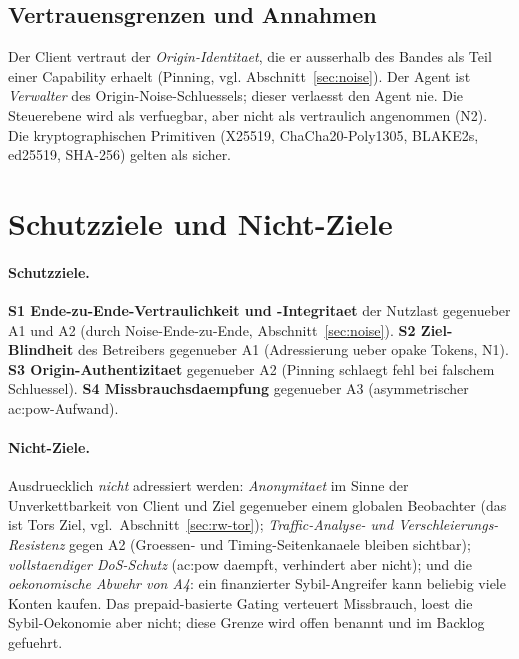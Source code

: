 \subsection{Vertrauensgrenzen und Annahmen}

Der Client vertraut der \emph{Origin-Identitaet}, die er ausserhalb des Bandes
als Teil einer Capability erhaelt (Pinning, vgl.
Abschnitt~\ref{sec:noise}). Der Agent ist \emph{Verwalter} des
Origin-Noise-Schluessels; dieser verlaesst den Agent nie. Die Steuerebene wird
als verfuegbar, aber nicht als vertraulich angenommen (N2). Die kryptographischen
Primitiven (X25519, ChaCha20-Poly1305, BLAKE2s, ed25519, SHA-256) gelten als
sicher.

\section{Schutzziele und Nicht-Ziele}
\label{sec:schutzziele}

\paragraph{Schutzziele.}
\textbf{S1 Ende-zu-Ende-Vertraulichkeit und -Integritaet} der Nutzlast gegenueber
A1 und A2 (durch Noise-Ende-zu-Ende, Abschnitt~\ref{sec:noise}).
\textbf{S2 Ziel-Blindheit} des Betreibers gegenueber A1 (Adressierung ueber opake
Tokens, N1). \textbf{S3 Origin-Authentizitaet} gegenueber A2 (Pinning schlaegt
fehl bei falschem Schluessel). \textbf{S4 Missbrauchsdaempfung} gegenueber A3
(asymmetrischer \gls{ac:pow}-Aufwand).

\paragraph{Nicht-Ziele.}
Ausdruecklich \emph{nicht} adressiert werden: \emph{Anonymitaet} im Sinne der
Unverkettbarkeit von Client und Ziel gegenueber einem globalen Beobachter (das
ist Tors Ziel, vgl.\ Abschnitt~\ref{sec:rw-tor}); \emph{Traffic-Analyse- und
Verschleierungs-Resistenz} gegen A2 (Groessen- und Timing-Seitenkanaele bleiben
sichtbar); \emph{vollstaendiger DoS-Schutz} (\gls{ac:pow} daempft, verhindert
aber nicht); und die \emph{oekonomische Abwehr von A4}: ein finanzierter
Sybil-Angreifer kann beliebig viele Konten kaufen. Das prepaid-basierte Gating
verteuert Missbrauch, loest die Sybil-Oekonomie aber nicht; diese Grenze wird
offen benannt und im Backlog gefuehrt.
